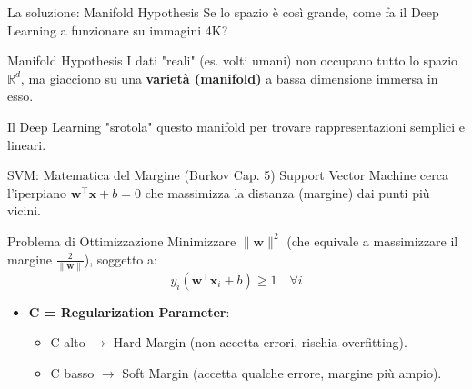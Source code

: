 \documentclass[aspectratio=169, 10pt]{beamer}
\begin{document}
\begin{frame}{La soluzione: Manifold Hypothesis}
    Se lo spazio è così grande, come fa il Deep Learning a funzionare su immagini 4K?
    
    \begin{block}{Manifold Hypothesis}
        I dati "reali" (es. volti umani) non occupano tutto lo spazio $\mathbb{R}^d$, ma giacciono su una \textbf{varietà (manifold)} a bassa dimensione immersa in esso.
    \end{block}
    
    \centering
    \vspace{0.5em}
    
    \small Il Deep Learning "srotola" questo manifold per trovare rappresentazioni semplici e lineari.
\end{frame}

\begin{frame}{SVM: Matematica del Margine (Burkov Cap. 5)}
    Support Vector Machine cerca l'iperpiano $\mathbf{w}^\top \mathbf{x} + b = 0$ che massimizza la distanza (margine) dai punti più vicini.
    
    \begin{block}{Problema di Ottimizzazione}
        Minimizzare $\|\mathbf{w}\|^2$ (che equivale a massimizzare il margine $\frac{2}{\|\mathbf{w}\|}$), soggetto a:
        \[ y_i (\mathbf{w}^\top \mathbf{x}_i + b) \ge 1 \quad \forall i \]
    \end{block}
    
    \begin{itemize}
        \item \textbf{C = Regularization Parameter}: 
        \begin{itemize}
            \item C alto $\to$ Hard Margin (non accetta errori, rischia overfitting).
            \item C basso $\to$ Soft Margin (accetta qualche errore, margine più ampio).
        \end{itemize}
    \end{itemize}
\end{frame}
\end{document}
